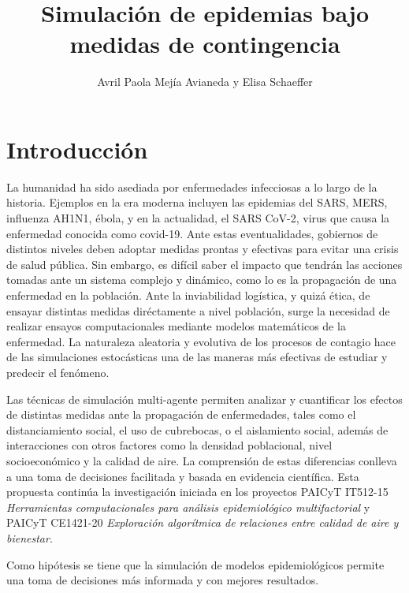 \documentclass{sciposter}
\title{Simulación de epidemias bajo medidas de contingencia}
\author{Avril Paola Mejía Avianeda y Elisa Schaeffer}
\institute {Posgrado en Ingeniería de Sistemas}
\begin{document}

\maketitle

\section{Introducción}
La humanidad ha sido asediada por enfermedades infecciosas a lo largo de la historia. Ejemplos en la era moderna incluyen las epidemias del SARS, MERS, influenza AH1N1, ébola, y en la actualidad, el SARS CoV-2, virus que causa la enfermedad conocida como covid-19. Ante estas eventualidades, gobiernos de distintos niveles deben adoptar medidas prontas y efectivas para evitar una crisis de salud pública. Sin embargo, es difícil saber el impacto que tendrán las acciones tomadas ante un sistema complejo y dinámico, como lo es la propagación de una enfermedad en la población. Ante la inviabilidad logística, y quizá ética, de ensayar distintas medidas diréctamente a nivel población, surge la necesidad de realizar ensayos computacionales mediante modelos matemáticos de la enfermedad. La naturaleza aleatoria y evolutiva de los procesos de contagio hace de las simulaciones estocásticas una de las maneras más efectivas de estudiar y predecir el fenómeno.

Las técnicas de simulación multi-agente permiten analizar y cuantificar los efectos de distintas medidas ante la propagación de enfermedades, tales como el distanciamiento social, el uso de cubrebocas, o el aislamiento social, además de interacciones con otros factores como la densidad poblacional, nivel socioeconómico y la calidad de aire. La comprensión de estas diferencias conlleva a una toma de decisiones facilitada y basada en evidencia científica. Esta propuesta continúa la investigación iniciada en los proyectos PAICyT IT512-15 \emph{Herramientas computacionales para análisis epidemiológico multifactorial} y PAICyT CE1421-20 \emph{Exploración algorítmica de relaciones entre calidad de aire y bienestar}.

Como hipótesis se tiene que la simulación de modelos epidemiológicos permite una toma de decisiones más informada y con mejores resultados.\par
\end{document}
